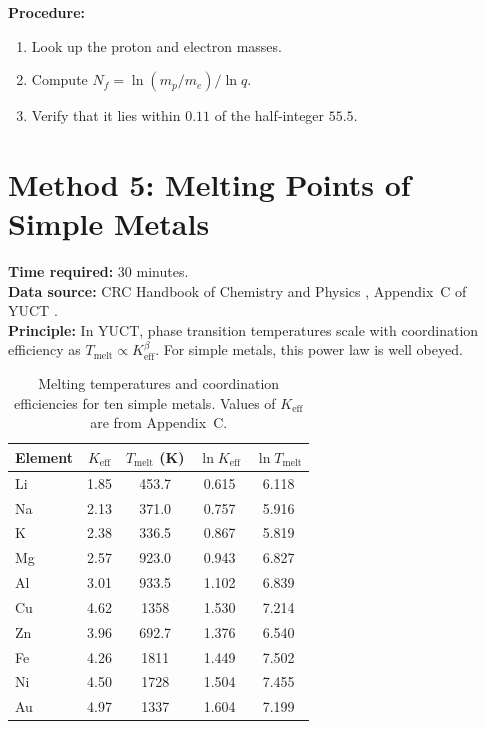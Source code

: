 \documentclass[12pt,a4paper]{article}
\newcommand{\Ke}{K_{\mathrm{eff}}}
\begin{document}
	\textbf{Procedure:}
	\begin{enumerate}[label=(\arabic*)]
		\item Look up the proton and electron masses.
		\item Compute \(N_f = \ln(m_p / m_e) / \ln q\).
		\item Verify that it lies within \(0.11\) of the half‑integer \(55.5\).
	\end{enumerate}
	
	\section{Method 5: Melting Points of Simple Metals}
	\label{sec:melting}
	
	\textbf{Time required:} 30 minutes.\\
	\textbf{Data source:} CRC Handbook of Chemistry and Physics \cite{CRC},
	Appendix~C of YUCT \cite{AppendixC}.\\
	\textbf{Principle:} In YUCT, phase transition temperatures scale with
	coordination efficiency as \(T_{\text{melt}} \propto \Ke^{\beta}\).  For
	simple metals, this power law is well obeyed.
	
	\begin{table}[H]
		\centering
		\caption{Melting temperatures and coordination efficiencies for ten
			simple metals.  Values of \(\Ke\) are from Appendix~C.}
		\label{tab:melting}
		\begin{tabular}{l c c c c}
			\toprule
			Element & \(\Ke\) & \(T_{\text{melt}}\) (K) & \(\ln \Ke\) & \(\ln T_{\text{melt}}\) \\
			\midrule
			Li & 1.85 & 453.7 & 0.615 & 6.118 \\
			Na & 2.13 & 371.0 & 0.757 & 5.916 \\
			K  & 2.38 & 336.5 & 0.867 & 5.819 \\
			Mg & 2.57 & 923.0 & 0.943 & 6.827 \\
			Al & 3.01 & 933.5 & 1.102 & 6.839 \\
			Cu & 4.62 & 1358  & 1.530 & 7.214 \\
			Zn & 3.96 & 692.7 & 1.376 & 6.540 \\
			Fe & 4.26 & 1811  & 1.449 & 7.502 \\
			Ni & 4.50 & 1728  & 1.504 & 7.455 \\
			Au & 4.97 & 1337  & 1.604 & 7.199 \\
			\bottomrule
		\end{tabular}
	\end{table}
	
\end{document}
